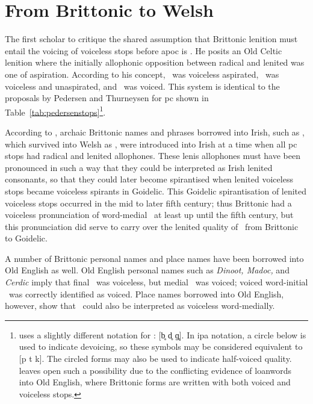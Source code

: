 \section{From Brittonic to Welsh}
\label{sec:from-brittonic-welsh}
The first scholar to critique the shared assumption that Brittonic lenition must entail the voicing of voiceless stops before \gls{apoc} is \textcite{koch_*cothairche_1990}. He posits an Old Celtic lenition where the initially allophonic opposition between radical and lenited was one of aspiration.  According to his concept, \xT\ was voiceless aspirated, \lT\ was voiceless and unaspirated, and \xD\ was voiced. This system is identical to the proposals by Pedersen and Thurneysen for \gls{pc} shown in Table~\ref{tab:pedersenstops}\footnote{\Textcite{koch_*cothairche_1990} uses a slightly different notation for \lT: [b̥ d̥ ɡ̥]. In \gls{ipa} notation, a circle below is used to indicate devoicing, so these symbols may be considered equivalent to [p t k]. The circled forms may also be used to indicate half-voiced quality. \Textcite[§~29]{koch_*cothairche_1990} leaves open such a possibility due to the conflicting evidence of loanwords into Old English, where Brittonic forms are written with both voiced and voiceless stops.}.

According to \textcite{koch_*cothairche_1990}, archaic Brittonic names and phrases borrowed into Irish, such as , which survived into Welsh as , were introduced into Irish at a time when all \gls{pc} stops had radical and lenited allophones. These lenis allophones must have been pronounced in such a way that they could be interpreted as Irish lenited consonants, so that they could later become spirantised when lenited voiceless stops became voiceless spirants in Goidelic. This Goidelic spirantisation of lenited voiceless stops occurred in the mid to later fifth century; thus Brittonic had a voiceless pronunciation of word-medial \lT\ at least up until the fifth century, but this pronunciation did serve to carry over the lenited quality of \lT\ from Brittonic to Goidelic.

A number of Brittonic personal names and place names have been borrowed into Old English as well. Old English personal names such as \textit{Dinoot, Madoc,} and \textit{Cerdic} imply that final \lT\ was voiceless, but medial \lT\ was voiced; voiced word-initial \xD\ was correctly identified as voiced. Place names borrowed into Old English, however, show that \lT\ could also be interpreted as voiceless word-medially.

